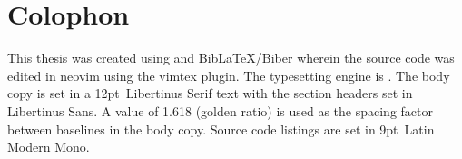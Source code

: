
\newpage
\thispagestyle{plain} %
\mbox{}
\chapter{Colophon}

This thesis was created using \LaTeXe{} and Bib\LaTeX{}/Biber wherein the source
code was edited in neovim using the vimtex plugin. The typesetting engine  is
. The body copy is set in a
12pt~Libertinus Serif text with the section headers set in Libertinus Sans. A
value of 1.618 (golden ratio) is used as the spacing factor between baselines
in the body copy. Source code listings are set in 9pt~Latin Modern Mono.
